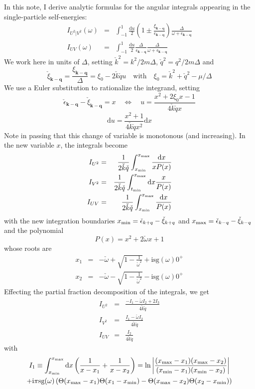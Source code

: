 \documentclass[10pt,a4paper,a4wide]{article}
\newcommand{\be}{\begin{equation}}
\newcommand{\ee}{\end{equation}}
\newcommand{\bea}{\begin{eqnarray}}
\newcommand{\eea}{\end{eqnarray}}
\newcommand{\kk}{\mathbf{k}}
\newcommand{\qq}{\mathbf{q}}
\newcommand{\ii}{\mathrm{i}}
\newcommand{\dd}{\mathrm{d}}
\newcommand{\bb}[1]{\left( #1 \right)}
\begin{document}
In this note, I derive analytic formulas for the angular integrals appearing in the single-particle self-energies:
\bea
I_{U^2|V^2}(\omega)&=&\int_{-1}^1 \frac{\dd u}{2}\bb{1\pm\frac{\xi_{\kk-\qq}}{\epsilon_{\kk-\qq}}} \frac{\Delta}{\omega+\epsilon_{\kk-\qq}}\\ 
I_{UV}(\omega)&=&\int_{-1}^1 \frac{\dd u}{2}{\frac{\Delta}{\epsilon_{\kk-\qq}}} \frac{\Delta}{\omega+\epsilon_{\kk-\qq}} 
\eea
We work here in units of $\Delta$, setting $\check k^2=k^2/2m\Delta$, $\check q^2=q^2/2m\Delta$ and
\be
\check{\xi}_{\kk-\qq}=\frac{{\xi}_{\kk-\qq}}{\Delta}=\xi_0-2\check k \check q u \quad \text{with} \quad  \xi_0=\check k^2+\check q^2-\mu/\Delta
\ee
We use a Euler substitution to rationalize the integrand, setting
\be
\check{\epsilon}_{\kk-\qq}-\check{\xi}_{\kk-\qq}=x \quad \Longleftrightarrow \quad u=\frac{x^2+2\xi_0 x-1}{4\check k\check q x} 
\ee
\be
\dd u = \frac{x^2+1}{4\check k\check q x^2} \dd x
\ee
Note in passing that this change of variable is monotonous (and increasing).
In the new variable $x$, the integrals become
\bea
I_{U^2}&=&\frac{1}{2\check k\check q }\int_{x_{\rm min}}^{x_{\rm max}}  \frac{\dd x}{xP(x)}\\ 
I_{V^2}&=&\frac{1}{2\check k\check q }\int_{t_{\rm min}}^{x_{\rm max}} \dd x \frac{x}{P(x)} \\
I_{UV}&=&\frac{1}{2\check k\check q  }\int_{x_{\rm min}}^{x_{\rm max}} \frac{\dd x}{P(x)}
\eea
with the new integration boundaries $x_{\rm min}=\check\epsilon_{k+q}-\check\xi_{k+q}$ and $x_{\rm max}=\check\epsilon_{k-q}-\check\xi_{k-q}$ and the polynomial
\be
P(x)=x^2+2\check\omega x+1
\ee
whose roots are
\bea
x_1 &=& -\check\omega+\sqrt{1-\frac{1}{\check\omega^2}} +\ii\text{sg}(\omega)0^+\\
x_2 &=& -\check\omega-\sqrt{1-\frac{1}{\check\omega^2}}  -\ii\text{sg}(\omega)0^+
\eea
Effecting the partial fraction decomposition of the integrals, we get
\bea
I_{U^2}&=&\frac{-I_1 -\check\omega I_2 +2I_3}{4\check k\check q}  \\ 
I_{V^2}&=& \frac{I_1-\check\omega I_2}{4\check k\check q}  \\
I_{UV}&=& \frac{I_2}{4\check k\check q } 
\eea
with
\begin{multline}
I_1\equiv \int_{x_{\rm min}}^{x_{\rm max}} \dd x \bb{\frac{1}{x-x_1}+\frac{1}{x-x_2}} =\text{ln} \left\vert\frac{(x_{\rm max}-x_1)(x_{\rm max}-x_2)}{(x_{\rm min}-x_1)(x_{\rm min}-x_2)}\right\vert\\+\ii\pi \text{sg}(\omega)\bb{\Theta(x_{\rm max}-x_1)\Theta(x_1-x_{\rm min})-\Theta(x_{\rm max}-x_2)\Theta(x_2-x_{\rm min})}
\end{multline}
\end{document}
